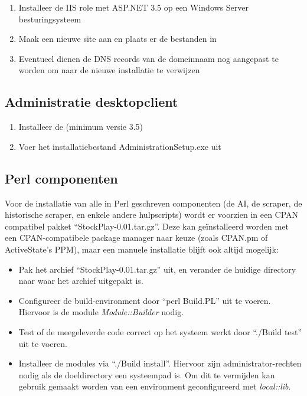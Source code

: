 \begin{enumerate}
\item{Installeer de IIS role met ASP.NET 3.5 op een Windows Server besturingsysteem}
\item{Maak een nieuwe site aan en plaats er de bestanden in}
\item{Eventueel dienen de DNS records van de domeinnaam nog aangepast te worden om naar de nieuwe installatie te verwijzen}
\end{enumerate}

\subsection{Administratie desktopclient}

\begin{enumerate}
\item Installeer de  (minimum versie 3.5)
\item{Voer het installatiebestand AdministrationSetup.exe uit}
\end{enumerate}

\subsection{Perl componenten}

Voor de installatie van alle in Perl geschreven componenten (de AI, de scraper, de historische scraper, en enkele andere hulpscripts) wordt er voorzien in een CPAN compatibel pakket ``StockPlay-0.01.tar.gz''. Deze kan ge\"installeerd worden met een CPAN-compatibele package manager naar keuze (zoals CPAN.pm of ActiveState's PPM), maar een manuele installatie blijft ook altijd mogelijk:
\begin{itemize}
\item Pak het archief ``StockPlay-0.01.tar.gz'' uit, en verander de huidige directory naar waar het archief uitgepakt is.
\item Configureer de build-environment door ``perl Build.PL'' uit te voeren. Hiervoor is de module \emph{Module::Builder} nodig.
\item Test of de meegeleverde code correct op het systeem werkt door ``./Build test'' uit te voeren.
\item Installeer de modules via ``./Build install''. Hiervoor zijn administrator-rechten nodig als de doeldirectory een systeempad is. Om dit te vermijden kan gebruik gemaakt worden van een environment geconfigureerd met \emph{local::lib}.
\end{itemize}

